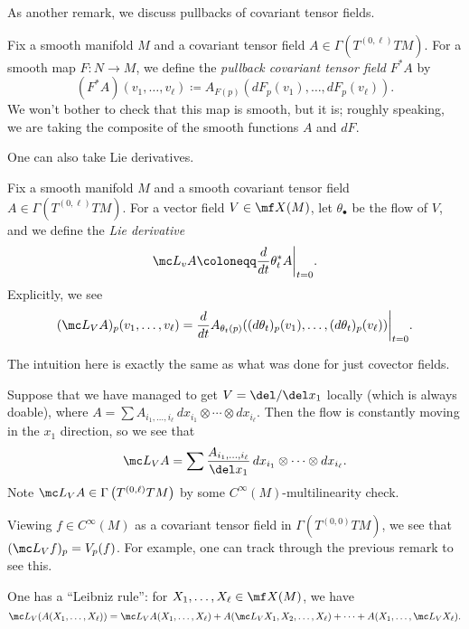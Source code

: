 \documentclass[../notes.tex]{subfiles}
\begin{document}
As another remark, we discuss pullbacks of covariant tensor fields.
\begin{definition}[pullback]
	Fix a smooth manifold $M$ and a covariant tensor field $A\in\Gamma\left(T^{(0,\ell)}TM\right)$. For a smooth map $F\colon N\to M$, we define the \textit{pullback covariant tensor field} $F^*A$ by
	\[(F^*A)(v_1,\ldots,v_\ell)\coloneqq A_{F(p)}(dF_p(v_1),\ldots,dF_p(v_\ell)).\]
	We won't bother to check that this map is smooth, but it is; roughly speaking, we are taking the composite of the smooth functions $A$ and $dF$.
\end{definition}
One can also take Lie derivatives.
\begin{definition}
	Fix a smooth manifold $M$ and a smooth covariant tensor field $A\in\Gamma\left(T^{(0,\ell)}TM\right)$. For a vector field $V\in\mf X(M)$, let $\theta_\bullet$ be the flow of $V$, and we define the \textit{Lie derivative}
	\[\mc L_vA\coloneqq\frac d{dt}\theta_t^*A\bigg|_{t=0}.\]
	Explicitly, we see
	\[(\mc L_VA)_p(v_1,\ldots,v_\ell)=\frac d{dt}A_{\theta_t(p)}((d\theta_t)_p(v_1),\ldots,(d\theta_t)_p(v_\ell))\bigg|_{t=0}.\]
\end{definition}
The intuition here is exactly the same as what was done for just covector fields.
\begin{remark}
	Suppose that we have managed to get $V=\del/\del x_1$ locally (which is always doable), where $A=\sum A_{i_1,\ldots,i_\ell}\,dx_{i_1}\otimes\cdots\otimes dx_{i_\ell}$. Then the flow is constantly moving in the $x_1$ direction, so we see that
	\[\mc L_VA=\sum\frac{A_{i_1,\ldots,i_\ell}}{\del x_1}\,dx_{i_1}\otimes\cdots\otimes dx_{i_\ell}.\]
	Note $\mc L_VA\in\Gamma\left(T^{(0,\ell)}TM\right)$ by some $C^\infty(M)$-multilinearity check.
\end{remark}
\begin{remark}
	Viewing $f\in C^\infty(M)$ as a covariant tensor field in $\Gamma\left(T^{(0,0)}TM\right)$, we see that $(\mc L_Vf)_p=V_p(f)$. For example, one can track through the previous remark to see this.
\end{remark}
\begin{remark}
	One has a ``Leibniz rule'': for $X_1,\ldots,X_\ell\in\mf X(M)$, we have
	\[\mc L_V(A(X_1,\ldots,X_\ell))=\mc L_VA(X_1,\ldots,X_\ell)+A(\mc L_VX_1,X_2,\ldots,X_\ell)+\cdots+A(X_1,\ldots,\mc L_VX_\ell).\]
\end{remark}
\end{document}

